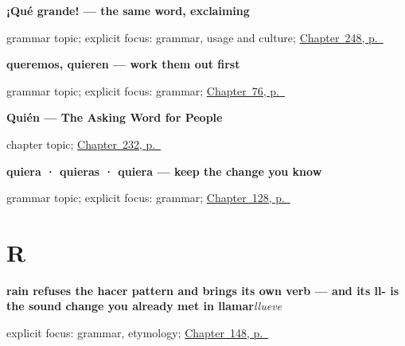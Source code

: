 \noindent\begin{minipage}[t]{\linewidth}
\raggedright
\textbf{¡Qué grande! — the same word, exclaiming}\par
\footnotesize grammar topic; explicit focus: grammar, usage and culture; \hyperref[ch:que-grande]{Chapter~248, p.~\pageref*{ch:que-grande}}
\end{minipage}\par\smallskip

\noindent\begin{minipage}[t]{\linewidth}
\raggedright
\textbf{queremos, quieren — work them out first}\par
\footnotesize grammar topic; explicit focus: grammar; \hyperref[ch:spanish-derive-plurals]{Chapter~76, p.~\pageref*{ch:spanish-derive-plurals}}
\end{minipage}\par\smallskip

\noindent\begin{minipage}[t]{\linewidth}
\raggedright
\textbf{Quién --- The Asking Word for People}\par
\footnotesize chapter topic; \hyperref[ch:quien]{Chapter~232, p.~\pageref*{ch:quien}}
\end{minipage}\par\smallskip

\noindent\begin{minipage}[t]{\linewidth}
\raggedright
\textbf{quiera · quieras · quiera — keep the change you know}\par
\footnotesize grammar topic; explicit focus: grammar; \hyperref[ch:spanish-subjuntivo-yo-stem]{Chapter~128, p.~\pageref*{ch:spanish-subjuntivo-yo-stem}}
\end{minipage}\par\smallskip

\section*{R}

\noindent\begin{minipage}[t]{\linewidth}
\raggedright
\textbf{rain refuses the hacer pattern and brings its own verb — and its ll- is the sound change you already met in llamar}\enspace\emph{llueve}\par
\footnotesize explicit focus: grammar, etymology; \hyperref[ch:spanish-weather]{Chapter~148, p.~\pageref*{ch:spanish-weather}}
\end{minipage}\par\smallskip

